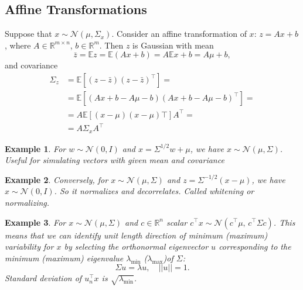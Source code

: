 \documentclass{article}[12pt]
\def\E{\E}
\def \E{\mathbb E}
\newtheorem{example}{Example}
\begin{document}
\subsection{Affine Transformations}
Suppose that $x\sim\mathcal{N}(\mu,\Sigma_x)$. Consider an affine transformation of $x$: $z=Ax+b$, where $A\in\mathbb{R}^{m\times n}$, $b\in\mathbb{R}^m$. Then $z$ is Gaussian with mean
\begin{equation}
\bar{z}=\E z=\E (Ax+b)= A\E x +b = A\mu +b,
\end{equation}
and covariance
\begin{equation}
\begin{aligned}
\Sigma_z &= \E \left[ (z-\bar{z})(z-\bar{z})^\top \right]=\\
&=\E \left[(Ax+b - A\mu-b)(Ax+b - A\mu-b)^\top \right] = \\
&=A\E \left[(x-\mu)(x-\mu)\top\right]A^\top =\\
&= A\Sigma_x A^\top 
\end{aligned}
\end{equation}
\begin{example}
	For $w\sim\mathcal{N}(0,I)$ and $x=\Sigma^{1/2}w +\mu$, we have $x\sim\mathcal{N}(\mu,\Sigma)$.
	Useful for simulating vectors with given mean and covariance
\end{example}
\begin{example}
	Conversely, for $x\sim\mathcal{N}(\mu,\Sigma)$ and $z=\Sigma^{-1/2}(x-\mu)$, we have $x\sim\mathcal{N}(0,I)$. So it normalizes and decorrelates. Called \textit{whitening} or \textit{normalizing}.
\end{example}
\begin{example}
	For $x\sim\mathcal{N}(\mu,\Sigma)$ and $c\in\mathbb{R}^n$ scalar $c^\top x\sim\mathcal{N}(c^\top\mu,\,c^\top \Sigma c)$.
	This means that we can identify unit length direction of minimum (maximum) variability for $x$ by selecting the orthonormal eigenvector $u$ corresponding to the minimum (maximum) eigenvalue $\lambda_{\min}$ ($\lambda_{\max}$)of $\Sigma$:
	\begin{equation}
	\Sigma u = \lambda u,\quad ||u||=1.
	\end{equation}
	Standard deviation of $u_n^\top x$ is $\sqrt{\lambda_{\min}}$.
\end{example}
\end{document}
